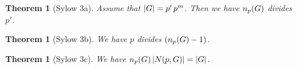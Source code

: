 \documentclass[12pt]{article}
\newtheorem{theorem}[definition]{Theorem}
\numberwithin{definition}{section}
\begin{document}
\begin{cnl}
\begin{theorem}[Sylow 3a]
Assume that $\grouporder{G} = p'\*\natpow{p}{\mult{p}{G}}$.
Then we have $\SylN{p}{G}$ divides $p'$.
\end{theorem}

\begin{theorem}[Sylow 3b]
We have $p$ divides $(\SylN{p}{G} - 1)$.
\end{theorem}

\begin{theorem}[Sylow 3c]
We have $\SylN{p}{G}\*\Nz{p}{G} = \grouporder{G}$.
\end{theorem}

\end{cnl}
\end{document}
